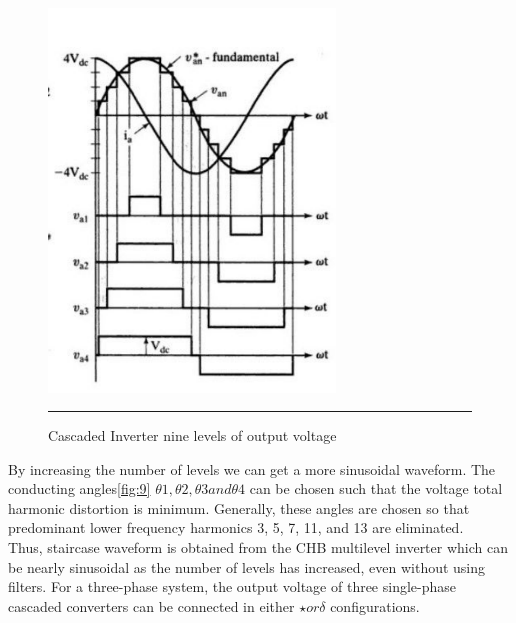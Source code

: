 \begin{figure}[htbp]
	\centering
		\includegraphics[width = 3in]{./Figures/ninewave.pdf}
		\rule{35em}{5pt}
	\caption{Cascaded Inverter nine levels of output voltage}
	\label{fig:8}
\end{figure}
By increasing the number of levels we can get a more sinusoidal waveform.
The conducting angles\ref{fig:9} $\theta1, \theta2, \theta3  and  \theta4$ can be chosen such that the voltage total harmonic distortion is minimum.
Generally, these angles are chosen so that predominant lower frequency harmonics 3, 5, 7, 11, and 13 are eliminated.\\
Thus, staircase waveform is obtained from the CHB multilevel
inverter which can be nearly sinusoidal as the number of levels has
increased, even without using filters. For a three-phase system, the
output voltage of three single-phase cascaded converters can be
connected in either $\star  or \delta$  configurations.

